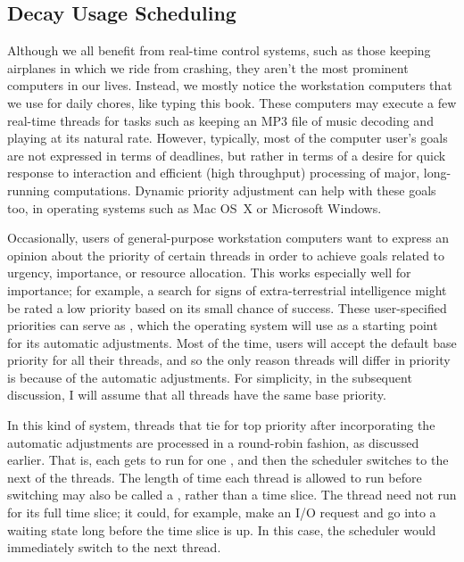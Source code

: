 \subsection{Decay Usage Scheduling}\label{decay-usage-scheduling-section}
Although we all benefit from real-time control systems, such as those
keeping airplanes in which we ride from crashing, they aren't the most
prominent computers in our lives.  Instead, we mostly notice the
workstation computers that we use for daily chores, like typing this
book.  These computers may execute a few real-time threads for tasks
such as keeping an MP3 file of music decoding and playing at its
natural rate.  However, typically, most of the computer user's goals
are not expressed in terms of deadlines, but rather in terms of a
desire for quick response to interaction and efficient (high
throughput) processing of major, long-running computations.  Dynamic
priority adjustment can help with these goals too, in operating
systems such as Mac OS~X or Microsoft Windows.

Occasionally, users of general-purpose workstation computers want to
express an opinion about the priority of certain threads in order to
achieve goals related to urgency, importance, or resource allocation.
This works especially well for importance; for example, a search for
signs of extra-terrestrial intelligence might be rated a low priority
based on its small chance of success.   These
user-specified priorities can serve as , which the operating
system will use as a starting point for its automatic adjustments.
Most of the time, users will accept the default base priority for all
their threads, and so the only reason threads will differ in priority
is because of the automatic adjustments.  For simplicity, in the
subsequent discussion, I will assume that all threads have the same base
priority.

In this kind of system, threads that tie for top priority after
incorporating the automatic adjustments are processed in a
round-robin fashion, as discussed earlier.  That is, each gets to run
for one , and then the scheduler switches
to the next of the threads.
The length of time each thread is allowed to run before switching may
also be called a , rather than a time slice.
The thread need not run for
its full time slice; it could, for example, make an I/O request and go
into a waiting state long before the time slice is up.  In this case,
the scheduler would immediately switch to the next thread.

